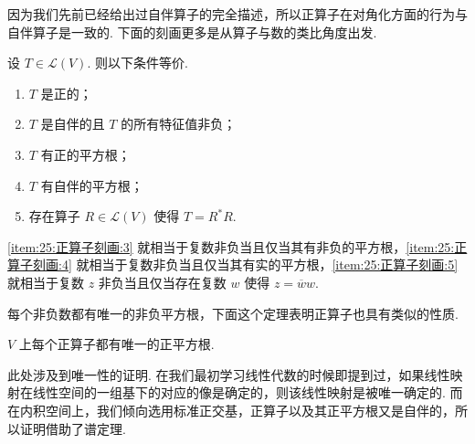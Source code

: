因为我们先前已经给出过自伴算子的完全描述，所以正算子在对角化方面的行为与自伴算子是一致的. 下面的刻画更多是从算子与数的类比角度出发.

\begin{theorem}{}{}
    设 $ T \in \mathcal{L}(V) $. 则以下条件等价.
    \begin{enumerate}
        \item \label{item:25:正算子刻画:1}
              $ T $ 是正的；

        \item \label{item:25:正算子刻画:2}
              $ T $ 是自伴的且 $ T $ 的所有特征值非负；

        \item \label{item:25:正算子刻画:3}
              $ T $ 有正的平方根；

        \item \label{item:25:正算子刻画:4}
              $ T $ 有自伴的平方根；

        \item \label{item:25:正算子刻画:5}
              存在算子 $ R \in \mathcal{L}(V) $ 使得 $ T = R^{*}R $.
    \end{enumerate}
\end{theorem}

\ref*{item:25:正算子刻画:3} 就相当于复数非负当且仅当其有非负的平方根，\ref*{item:25:正算子刻画:4} 就相当于复数非负当且仅当其有实的平方根，\ref*{item:25:正算子刻画:5} 就相当于复数 $ z $ 非负当且仅当存在复数 $ w $ 使得 $ z = \overline{w}w $.

每个非负数都有唯一的非负平方根，下面这个定理表明正算子也具有类似的性质.

\begin{theorem}{}{}
    $ V $ 上每个正算子都有唯一的正平方根.
\end{theorem}

此处涉及到唯一性的证明. 在我们最初学习线性代数的时候即提到过，如果线性映射在线性空间的一组基下的对应的像是确定的，则该线性映射是被唯一确定的. 而在内积空间上，我们倾向选用标准正交基，正算子以及其正平方根又是自伴的，所以证明借助了谱定理.

